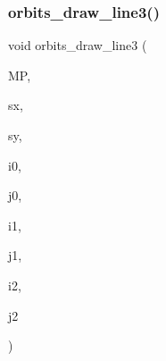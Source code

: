 \subsubsection{\texorpdfstring{orbits\+\_\+draw\+\_\+line3()}{orbits\_draw\_line3()}}
{\footnotesize\ttfamily void orbits\+\_\+draw\+\_\+line3 (\begin{DoxyParamCaption}\item[{\mbox{\hyperlink{classmp__graphics}{mp\+\_\+graphics}} \&}]{MP,  }\item[{\mbox{\hyperlink{galois_8h_a09fddde158a3a20bd2dcadb609de11dc}{I\+NT}}}]{sx,  }\item[{\mbox{\hyperlink{galois_8h_a09fddde158a3a20bd2dcadb609de11dc}{I\+NT}}}]{sy,  }\item[{\mbox{\hyperlink{galois_8h_a09fddde158a3a20bd2dcadb609de11dc}{I\+NT}}}]{i0,  }\item[{\mbox{\hyperlink{galois_8h_a09fddde158a3a20bd2dcadb609de11dc}{I\+NT}}}]{j0,  }\item[{\mbox{\hyperlink{galois_8h_a09fddde158a3a20bd2dcadb609de11dc}{I\+NT}}}]{i1,  }\item[{\mbox{\hyperlink{galois_8h_a09fddde158a3a20bd2dcadb609de11dc}{I\+NT}}}]{j1,  }\item[{\mbox{\hyperlink{galois_8h_a09fddde158a3a20bd2dcadb609de11dc}{I\+NT}}}]{i2,  }\item[{\mbox{\hyperlink{galois_8h_a09fddde158a3a20bd2dcadb609de11dc}{I\+NT}}}]{j2 }\end{DoxyParamCaption})}

\mbox{\label{draw_8_c_ac219f91f40350f9f7aef5ed9e9cf32e9}} 
